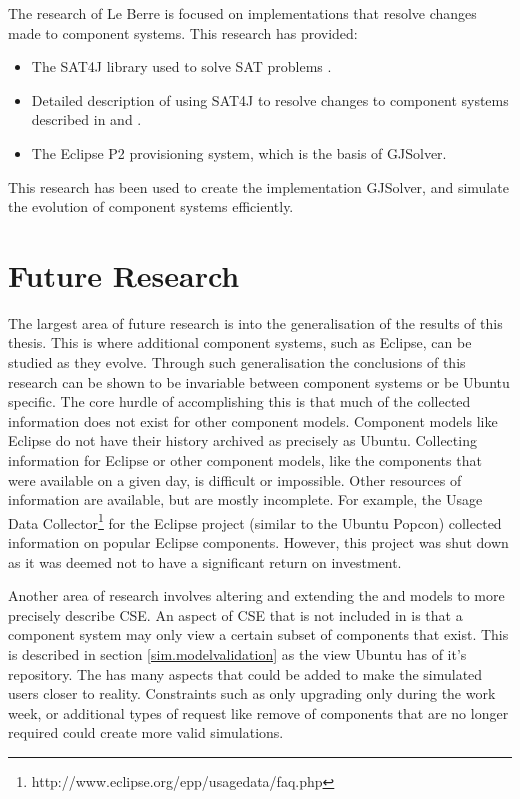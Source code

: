 The research of Le Berre is focused on implementations that resolve changes made to component systems.
This research has provided:
\begin{itemize}
  \item The SAT4J library used to solve SAT problems \citep{le2010sat4j}.
  \item Detailed description of using SAT4J to resolve changes to component systems described in \citep{le_berre_dependency_2009} and \citep{leBerre2010}.
  \item The Eclipse P2 provisioning system, which is the basis of GJSolver.
\end{itemize}
This research has been used to create the implementation GJSolver, and simulate the evolution of component systems efficiently.

\section{Future Research}
The largest area of future research is into the generalisation of the results of this thesis.
This is where additional component systems, such as Eclipse, can be studied as they evolve. 
Through such generalisation the conclusions of this research can be shown to be invariable between component systems or be Ubuntu specific.
The core hurdle of accomplishing this is that much of the collected information does not exist for other component models.
Component models like Eclipse do not have their history archived as precisely as Ubuntu.
Collecting information for Eclipse or other component models, like the components that were available on a given day, is difficult or impossible.
Other resources of information are available, but are mostly incomplete.
For example, the Usage Data Collector\footnote{http://www.eclipse.org/epp/usagedata/faq.php} for the Eclipse project (similar to the Ubuntu Popcon) collected information on popular Eclipse components. 
However, this project was shut down as it was deemed not to have a significant return on investment. 
 
Another area of research involves altering and extending the \modelname and \usermodel models to more precisely describe CSE.
An aspect of CSE that is not included in \modelname is that a component system may only view a certain subset of components that exist.
This is described in section \ref{sim.modelvalidation} as the view Ubuntu has of it's repository.
The \usermodel has many aspects that could be added to make the simulated users closer to reality.
Constraints such as only upgrading only during the work week, 
or additional types of request like remove of components that are no longer required could create more valid simulations.

